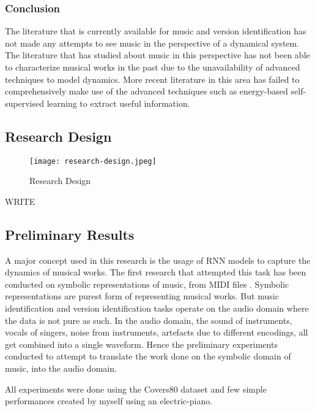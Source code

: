 \documentclass[../main.tex]{subfiles}
\begin{document}
\subsubsection{Conclusion}
\par
The literature that is currently available for music and version identification has not made any attempts to see music in the perspective of a dynamical system. The literature that has studied about music in this perspective has not been able to characterize musical works in the past due to the unavailability of advanced techniques to model dynamics. More recent literature in this area has failed to comprehensively make use of the advanced techniques such as energy-based self-supervised learning to extract useful information.

\subsection{Research Design}

\begin{figure}[h]
    \centering
    \texttt{[image: research-design.jpeg]}
    \caption{Research Design}
    \label{fig:research-design}
\end{figure}

WRITE

\newpage
\subsection{Preliminary Results}

\par
A major concept used in this research is the usage of \gls{RNN} models to capture the dynamics of musical works. The first research that attempted this task has been conducted on symbolic representations of music, from MIDI files \cite{tian_cheng_comparing_2018}. Symbolic representations are purest form of representing musical works. But music identification and version identification tasks operate on the audio domain where the data is not pure as such. In the audio domain, the sound of instruments, vocals of singers, noise from instruments, artefacts due to different encodings, all get combined into a single waveform. Hence the preliminary experiments conducted to attempt to translate the work done on the symbolic domain of music, into the audio domain.

\par
All experiments were done using the Covers80\cite{Covers80CoverSon} dataset and few simple performances created by myself using an electric-piano.
\end{document}
